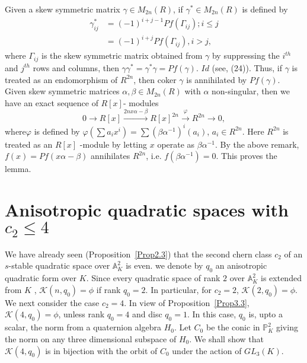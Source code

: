 \begin{Proof}
Given a skew symmetric matrix $\gamma \in M_{2n}(R)$, if $\gamma^{\ast}\in M_{2n}(R)$ is defined by 
$$
\begin{aligned}
\gamma^{\ast}_{ij}&=(-1)^{i+j-1}Pf(\Gamma_{ij}); i\leq j\\
&{}=(-1)^{i+j}Pf(\Gamma_{ij}),i>j,
\end{aligned}
$$
where $\Gamma_{ij}$ is the skew symmetric matrix obtained from
$\gamma$ by suppressing the $i^{th}$ and $j^{th}$ rows and columns,
then
$\gamma \gamma^{\ast}=\gamma^{\ast}\gamma=Pf(\gamma)$. $Id$ (see\cite{key11},
(24)). Thus, if $\gamma$ is treated as an endomorphism of $R^{2n}$,
then coker $\gamma$ is annihilated by $Pf(\gamma)$. Given skew
symmetric matrices $\alpha, \beta \in M_{2n}(R)$ with $\alpha$
non-singular, then we have an exact sequence \cite[p. 630]{key3} of $R[x]$- modules 
$$
0\to R[x]\xrightarrow{2nx\alpha-\beta} R[x]^{2n}\xrightarrow{\varphi} R^{2n}\to 0, 
$$ 
where\pageoriginale $\varphi$ is defined by $\varphi\left(\sum a_i x^{i}\right)=\sum\left(\beta\alpha^{-1}\right)^{i}(a_i)$, $a_i\in R^{2n}$. Here $R^{2n}$ is treated as an $R[x]$ -module by letting $x$ operate as $\beta \alpha^{-1}$. By the above remark, $f(x)=Pf(x\alpha-\beta)$ annihilates $R^{2n}$, i.e. $f\left(\beta\alpha^{-1}\right)=0$. This proves the lemma. 
\end{Proof}

\section{Anisotropic quadratic spaces with \texorpdfstring{$c_2\leq 4$}{eq}}\label{s4}

We have already seen (Proposition~\ref{Prop2.3}) that the second chern class $c_2$ of an $s$-stable quadratic space over $\mathbb{A}^{2}_K$ is even. we denote by $q_0$ an anisotropic quadratic form over $K$. Since every quadratic space of rank $2$ over $\mathbb{A}^{2}_K$ is extended from $K$ \cite[Prop 1.1]{key9}, $\mathscr{K}(n,q_0)=\phi$ if rank $q_0=2$. In particular, for $c_2=2$, $\mathscr{K}(2,q_0)=\phi$. We next consider the case $c_2=4$. In view of Proposition~\ref{Prop3.3}, $\mathscr{K}(4,q_0)=\phi$, unless rank $q_0=4$ and disc $q_0=1$. In this case, $q_0$ is, upto a scalar, the norm from a  quaternion algebra $H_0$. Let $C_0$ be the conic in $\mathbb{P}^{2}_K$ giving the norm on any three dimensional subspace of $H_0$. We shall show that $\mathscr{K}(4,q_0)$ is in bijection with the orbit of $C_0$ under the action of $GL_3(K)$. 

